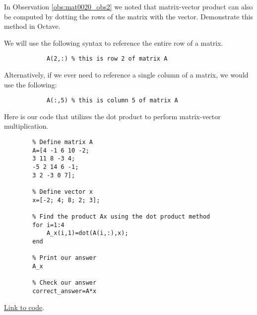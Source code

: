 \documentclass{ximera}
\begin{document}
\begin{example}\label{ex_oct_mat_prod_dot}
In Observation \ref{obs:mat0020_obs2} we noted that matrix-vector product can also be computed by dotting the rows of the matrix with the vector.  Demonstrate this method in Octave.
    \begin{explanation}
        We will use the following syntax to reference the entire row of a matrix.
        \begin{verbatim}
            A(2,:) % this is row 2 of matrix A
        \end{verbatim}
        Alternatively, if we ever need to reference a single column of a matrix, we would use the following:
        \begin{verbatim}
            A(:,5) % this is column 5 of matrix A
        \end{verbatim}

    Here is our code that utilizes the dot product to perform matrix-vector multiplication.

    \begin{verbatim}
        % Define matrix A 
        A=[4 -1 6 10 -2;  
        3 11 8 -3 4;  
        -5 2 14 6 -1;  
        3 2 -3 0 7];  
        
        % Define vector x  
        x=[-2; 4; 8; 2; 3];  
        
        % Find the product Ax using the dot product method
        for i=1:4  
            A_x(i,1)=dot(A(i,:),x);  
        end  
        
        % Print our answer  
        A_x  
        
        % Check our answer  
        correct_answer=A*x  
    \end{verbatim}

    \href{https://sagecell.sagemath.org/?z=eJxdj0FLAzEQhe-F_od3KXSlgWZ3raUlh6B49uKpSCmbqRukicxmNT_f2ahFDDnMvO_NG2aBBzr7QLicEvsMi_nMmkMLpbGBXkPVe4jWQGtsoRq0pVe3qKFb8Sj9Y6gnusbdS-nlL_A8ECtXFjh8UJciI080m8MULFnbPaRo_gw9-uCQesI7Rzd2CTZjHHx4LaKL6QoulPro5rOzxHqjd23JkGePeelXujLiXlopd9UqV2UFSfjvpif2ISGOjFMYPoknIKNXft9T9_aPd5FZDjl-K8be5C-N81KK&lang=octave&interacts=eJyLjgUAARUAuQ==}{Link to code}.
    \end{explanation}
\end{example}

    
\end{document}

